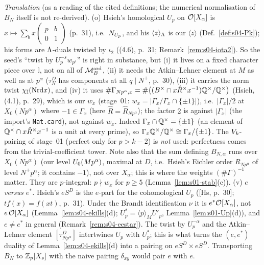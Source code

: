 \noindent\emph{Translation} \stproved{} (as a reading of the cited definitions; the numerical normalisation of $B_N$ itself is not
re-derived). (o) Hsieh's homological $U_p$ on $\mathcal{O}[X_\alpha]$ is $x\mapsto\sum_bx\left(\begin{smallmatrix}p&b\\0&1\end{smallmatrix}\right)$
(p.~31), i.e.\ $N_{U_p}$, and his $\langle z\rangle_\Lambda$ is our $\langle z\rangle$ (Def.~\ref{def:s04-Pk}); his forms are $\Lambda$-duals
twisted by $\iota_2$ ((4.6), p.~31; Remark~\ref{rem:s04-iota2}). So the seed's ``twist by $U_p^{-s}w_{p^s}$'' is right in substance,
but (i) it lives on a fixed character piece over $\mathbb I$, not on all of $\mathcal{M}^{\mathrm{ord}}_B$, (ii) it needs the Atkin--Lehner element at $M$ as
well as at $p^\alpha$ ($\tau^D_{N}$ has components at all $q\mid N^+$, p.~30), (iii) it carries the norm twist $\chi_{\mathbb I}(\mathrm{Nrd} x)$,
and (iv) it uses $\#\Gamma_{Np^\alpha,x}=\#\big((B^\times\cap x\hat R^\times x^{-1})\mathbb{Q}^\times/\mathbb{Q}^\times\big)$ (Hsieh, (4.1), p.~29),
which is our $w_x$ (stage~01: $w_x=|\Gamma_x/\Gamma_x\cap\{\pm1\}|$), i.e.\ $|\Gamma_x|/2$ at $X_0(Np^\alpha)$ where $-1\in\Gamma_x$ (here $\hat R=\hat R_{Np^\alpha}$); the
factor $2$ is against $|\Gamma_x|$ (the import's \texttt{Nat.card}), not against $w_x$. Indeed $\Gamma_x\cap\mathbb{Q}^\times=\{\pm1\}$ (an
element of $\mathbb{Q}^\times\cap x\hat R^\times x^{-1}$ is a unit at every prime), so $\Gamma_x\mathbb{Q}^\times/\mathbb{Q}^\times\cong\Gamma_x/\{\pm1\}$.
The $V_k$-pairing of stage~01 (perfect only for $p>k-2$) is \emph{not} used: perfectness comes from the trivial-coefficient tower.
Note also that the sum defining $B_{N,\alpha}$ runs over $X_0(Np^\alpha)$ (our level $U_0(Mp^\alpha)$, maximal at $D$, i.e.\ Hsieh's
Eichler order $R_{Np^\alpha}$ of level $N^+p^\alpha$; it contains $-1$), not over $X_\alpha$; this is where the weights $(\#\Gamma)^{-1}$
matter. They are $p$-integral: $p\nmid w_x$ for $p\ge5$ (Lemma~\ref{lem:s01-stab}(c)).
(v) \emph{$e$ versus $e^*$.} Hsieh's $eS^D$ is the $e$-part for the cohomological $U_p$ ([Hs, p.~30]; $tf(x)=f(xt)$, p.~31). Under the
Brandt identification $\nu$ it is $e^*\mathcal{O}[X_\alpha]$, not $e\,\mathcal{O}[X_\alpha]$ (Lemma~\ref{lem:s04-ekills}(d); $U_p^*=\langle p\rangle_MU'_p$,
Lemma~\ref{lem:s01-Up}(d)), and $e\ne e^*$ in general (Remark~\ref{rem:s04-eestar}). The twist by $U_p^{-\alpha}$ and the Atkin--Lehner
element $[\tau^D_{Np^\alpha}]$ intertwines $U_p$ with $U_p^*$; this is what turns the $(e,e^*)$ duality of Lemma~\ref{lem:s04-ekills}(d)
into a pairing on $eS^D\times eS^D$. Transporting $B_N$ to $\mathbb{Z}_p[X_s]$ with the naive pairing $\delta_{xy}$ would pair $e$ with $e$.

